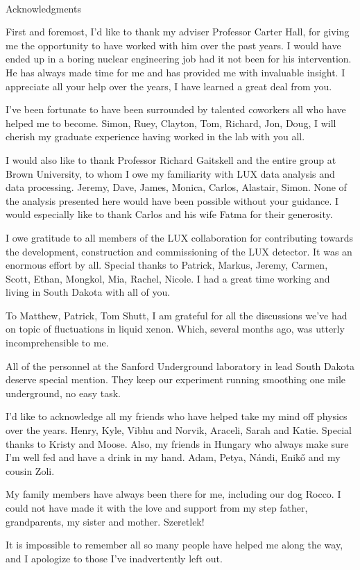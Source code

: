 
\renewcommand{\baselinestretch}{2}
\small\normalsize
\hbox{\ }
 
\vspace{-.65in}

\begin{center}
\large{Acknowledgments} 
\end{center} 

\vspace{1ex}


First and foremost, I'd like to thank my adviser Professor Carter Hall, for giving me the opportunity to have worked with him over the past years. I would have ended up in a boring nuclear engineering job had it not been for his intervention. He has always made time for me and has provided me with invaluable insight. I appreciate all your help over the years, I have learned a great deal from you.

I've been fortunate to have been surrounded by talented coworkers all who have helped me to become. Simon, Ruey, Clayton, Tom, Richard, Jon, Doug, I will cherish my graduate experience having worked in the lab with you all.

I would also like to thank Professor Richard Gaitskell and the entire group at Brown University, to whom I owe my familiarity with LUX data analysis and data processing. Jeremy, Dave, James, Monica, Carlos, Alastair, Simon. None of the analysis presented here would have been possible without your guidance. I would especially like to thank Carlos and his wife Fatma for their generosity.

I owe gratitude to all members of the LUX collaboration for contributing towards the development, construction and commissioning of the LUX detector. It was an enormous effort by all. Special thanks to Patrick, Markus, Jeremy, Carmen, Scott, Ethan, Mongkol, Mia, Rachel, Nicole. I had a great time working and living in South Dakota with all of you.

To Matthew, Patrick, Tom Shutt, I am grateful for all the discussions we've had on topic of fluctuations in liquid xenon. Which, several months ago, was utterly incomprehensible to me.

All of the personnel at the Sanford Underground laboratory in lead South Dakota deserve special mention. They keep our experiment running smoothing one mile underground, no easy task. 

I'd like to acknowledge all my friends who have helped take my mind off physics over the years. Henry, Kyle, Vibhu and Norvik, Araceli, Sarah and Katie. Special thanks to Kristy and Moose. Also, my friends in Hungary who always make sure I'm well fed and have a drink in my hand. Adam, Petya, N\'{a}ndi, Enik\H{o} and my cousin Zoli. 

My family members have always been there for me, including our dog Rocco. I could not have made it with the love and support from my step father, grandparents, my sister and mother. Szeretlek!


It is impossible to remember all so many people have helped me along the way, and I apologize to those I've inadvertently left out.
